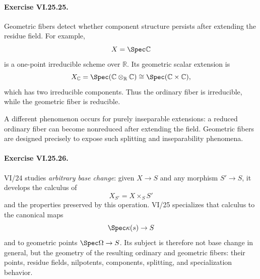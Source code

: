 \paragraph{Exercise VI.25.25.}
\begin{solution}
Geometric fibers detect whether component structure persists after extending the residue field.  For example,
\[
X=\Spec\mathbb C
\]
is a one-point irreducible scheme over \(\mathbb R\).  Its geometric scalar extension is
\[
X_{\mathbb C}
=
\Spec(\mathbb C\otimes_{\mathbb R}\mathbb C)
\cong
\Spec(\mathbb C\times\mathbb C),
\]
which has two irreducible components.  Thus the ordinary fiber is irreducible, while the geometric fiber is reducible.

A different phenomenon occurs for purely inseparable extensions: a reduced ordinary fiber can become nonreduced after extending the field.  Geometric fibers are designed precisely to expose such splitting and inseparability phenomena.
\end{solution}

\paragraph{Exercise VI.25.26.}
\begin{solution}
VI/24 studies \emph{arbitrary base change}: given \(X\to S\) and any morphism \(S'\to S\), it develops the calculus of
\[
X_{S'}=X\times_SS'
\]
and the properties preserved by this operation.  VI/25 specializes that calculus to the canonical maps
\[
\Spec\kappa(s)\to S
\]
and to geometric points \(\Spec\Omega\to S\).  Its subject is therefore not base change in general, but the geometry of the resulting ordinary and geometric fibers: their points, residue fields, nilpotents, components, splitting, and specialization behavior.
\end{solution}
